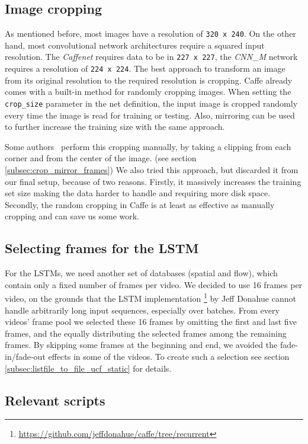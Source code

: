 \subsection{Image cropping}
As mentioned before, most images have a resolution of \texttt{320 x 240}.
On the other hand, most convolutional network architectures require a squared input resolution.
The \emph{Caffenet} requires data to be in \texttt{227 x 227}, the \emph{CNN\_M} network requires a resolution of \texttt{224 x 224}.
The best approach to transform an image from its original resolution to the required resolution is cropping.
Caffe already comes with a built-in method for randomly cropping images.
When setting the \texttt{crop\_size} parameter in the net definition, the input image is cropped randomly every time the image is read for training or testing.
Also, mirroring can be used to further increase the training size with the same approach.

Some authors~\cite{ye2015evaluating} perform this cropping manually, by taking a clipping from each corner and from the center of the image. (see section \ref{subsec:crop_mirror_frames})
We also tried this approach, but discarded it from our final setup, because of two reasons.
Firstly, it massively increases the training set size making the data harder to handle and requiring more disk space.
Secondly, the random cropping in Caffe is at least as effective as manually cropping and can save us some work.

\subsection{Selecting frames for the LSTM}
For the LSTMs, we need another set of databases (spatial and flow), which contain only a fixed number of frames per video.
We decided to use 16 frames per video, on the grounds that the LSTM implementation \footnote{\url{https://github.com/jeffdonahue/caffe/tree/recurrent}} by Jeff Donahue cannot handle arbitrarily long input sequences, especially over batches.
From every videos' frame pool we selected these 16 frames by omitting the first and last five frames, and the equally distributing the selected frames among the remaining frames.
By skipping some frames at the beginning and end, we avoided the fade-in/fade-out effects in some of the videos. To create such a selection see section \ref{subsec:listfile_to_file_ucf_static} for details.

\subsection{Relevant scripts}

